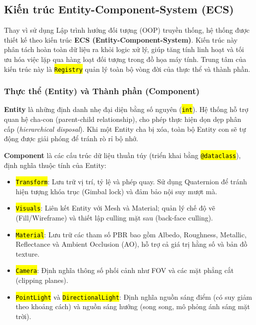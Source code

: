\documentclass[a4paper]{article}
\newcommand{\code}[1]{\hl{\texttt{#1}}}
\begin{document}
\subsection{Kiến trúc Entity-Component-System (ECS)}
\hspace{12pt}
Thay vì sử dụng Lập trình hướng đối tượng (OOP) truyền thống, hệ thống được thiết kế theo kiến trúc \textbf{ECS (Entity-Component-System)}. Kiến trúc này phân tách hoàn toàn dữ liệu ra khỏi logic xử lý, giúp tăng tính linh hoạt và tối ưu hóa việc lặp qua hàng loạt đối tượng trong đồ họa máy tính. Trung tâm của kiến trúc này là \code{Registry} quản lý toàn bộ vòng đời của thực thể và thành phần.

\subsubsection{Thực thể (Entity) và Thành phần (Component)}
\hspace{12pt}
\textbf{Entity} là những định danh nhẹ đại diện bằng số nguyên (\code{int}). Hệ thống hỗ trợ quan hệ cha-con (parent-child relationship), cho phép thực hiện dọn dẹp phân cấp (\textit{hierarchical disposal}). Khi một Entity cha bị xóa, toàn bộ Entity con sẽ tự động được giải phóng để tránh rò rỉ bộ nhớ.

\textbf{Component} là các cấu trúc dữ liệu thuần túy (triển khai bằng \code{@dataclass}), định nghĩa thuộc tính của Entity:
\begin{itemize}
    \item \code{Transform}: Lưu trữ vị trí, tỷ lệ và phép quay. Sử dụng Quaternion để tránh hiện tượng khóa trục (Gimbal lock) và đảm bảo nội suy mượt mà.
    \item \code{Visuals}: Liên kết Entity với Mesh và Material; quản lý chế độ vẽ (Fill/Wireframe) và thiết lập culling mặt sau (back-face culling).
    \item \code{Material}: Lưu trữ các tham số PBR bao gồm Albedo, Roughness, Metallic, Reflectance và Ambient Occlusion (AO), hỗ trợ cả giá trị hằng số và bản đồ texture.
    \item \code{Camera}: Định nghĩa thông số phối cảnh như FOV và các mặt phẳng cắt (clipping planes).
    \item \code{PointLight} và \code{DirectionalLight}: Định nghĩa nguồn sáng điểm (có suy giảm theo khoảng cách) và nguồn sáng hướng (song song, mô phỏng ánh sáng mặt trời).
\end{itemize}
\end{document}
